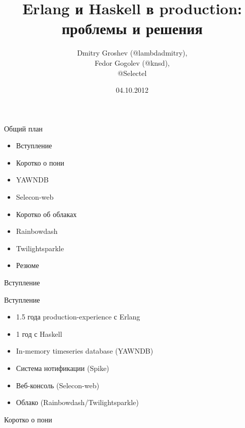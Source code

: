 \documentclass[10pt]{beamer}
\title[Erlang, Haskell, production]{Erlang и Haskell в production: проблемы и решения}
\author{Dmitry Groshev (@lambdadmitry),\\Fedor Gogolev (@knsd), \\@Selectel}
\date{ %
  04.10.2012}
\institute{FProg 2012-10}
\begin{document}
\renewcommand*{\inserttotalframenumber}{\pageref{lastframe}}
\begin{frame}
\titlepage
\end{frame}

\begin{frame}{Общий план}
  \begin{itemize}
  \item Вступление
  \item Коротко о пони
  \item YAWNDB
  \item Selecon-web
  \item Коротко об облаках
  \item Rainbowdash
  \item Twilightsparkle
  \item Резюме
  \end{itemize}
\end{frame}

\begin{frame}
  \begin{center}
    \Large
    Вступление
  \end{center}
\end{frame}

\begin{frame}{Вступление}
  \begin{itemize}
  \item 1.5 года production-experience с Erlang
  \item 1 год с Haskell
  \item In-memory timeseries database (YAWNDB)
  \item Система нотификации (Spike)
  \item Веб-консоль (Selecon-web)
  \item Облако (Rainbowdash/Twilightsparkle)
  \end{itemize}
\end{frame}

\begin{frame}
  \begin{center}
    \Large
    Коротко о пони
  \end{center}
\end{frame}
\end{document}
